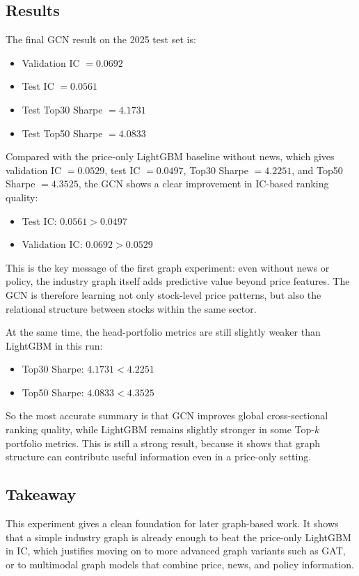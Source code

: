 \subsection{Results}

The final GCN result on the 2025 test set is:
\begin{itemize}
\item Validation IC $=0.0692$
\item Test IC $=0.0561$
\item Test Top30 Sharpe $=4.1731$
\item Test Top50 Sharpe $=4.0833$
\end{itemize}

Compared with the price-only LightGBM baseline without news, which gives validation IC $=0.0529$, test IC $=0.0497$, Top30 Sharpe $=4.2251$, and Top50 Sharpe $=4.3525$, the GCN shows a clear improvement in IC-based ranking quality:
\begin{itemize}
\item Test IC: $0.0561 > 0.0497$
\item Validation IC: $0.0692 > 0.0529$
\end{itemize}

This is the key message of the first graph experiment: even without news or policy, the industry graph itself adds predictive value beyond price features. The GCN is therefore learning not only stock-level price patterns, but also the relational structure between stocks within the same sector.

At the same time, the head-portfolio metrics are still slightly weaker than LightGBM in this run:
\begin{itemize}
\item Top30 Sharpe: $4.1731 < 4.2251$
\item Top50 Sharpe: $4.0833 < 4.3525$
\end{itemize}

So the most accurate summary is that GCN improves global cross-sectional ranking quality, while LightGBM remains slightly stronger in some Top-$k$ portfolio metrics. This is still a strong result, because it shows that graph structure can contribute useful information even in a price-only setting.

\subsection{Takeaway}

This experiment gives a clean foundation for later graph-based work. It shows that a simple industry graph is already enough to beat the price-only LightGBM in IC, which justifies moving on to more advanced graph variants such as GAT, or to multimodal graph models that combine price, news, and policy information.

